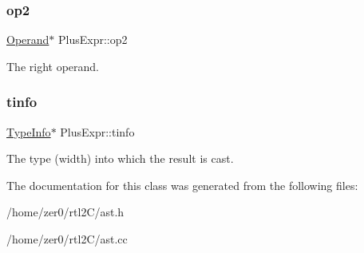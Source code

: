 \subsubsection{\texorpdfstring{op2}{op2}}
{\footnotesize\ttfamily \hyperlink{class_operand}{Operand}$\ast$ Plus\+Expr\+::op2\hspace{0.3cm}{\ttfamily [protected]}}

The right operand. \mbox{\label{class_plus_expr_af48b5356573a1592815d552f86551745}} 
\subsubsection{\texorpdfstring{tinfo}{tinfo}}
{\footnotesize\ttfamily \hyperlink{class_type_info}{Type\+Info}$\ast$ Plus\+Expr\+::tinfo\hspace{0.3cm}{\ttfamily [protected]}}

The type (width) into which the result is cast. 

The documentation for this class was generated from the following files\+:\begin{DoxyCompactItemize}
\item 
/home/zer0/rtl2\+C/ast.\+h\item 
/home/zer0/rtl2\+C/ast.\+cc\end{DoxyCompactItemize}
